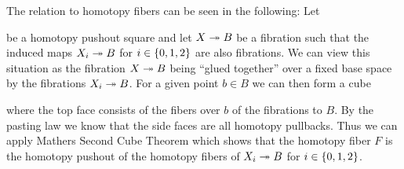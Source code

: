 The relation to homotopy fibers can be seen in the following:
Let 
\begin{center}
\end{center}
be a homotopy pushout square and let $X\xtwoheadrightarrow{} B$ be a fibration such that the induced maps $X_i\xtwoheadrightarrow{} B$ for $i\in\left\lbrace0,1,2\right\rbrace$ are also fibrations.
We can view this situation as the fibration $X\xtwoheadrightarrow{} B$ being ``glued together'' over a fixed base space by the fibrations $X_i\xtwoheadrightarrow{} B$.
For a given point $b\in B$ we can then form a cube 
\begin{center}
\end{center}
where the top face consists of the fibers over $b$ of the fibrations to $B$.
By the pasting law we know that the side faces are all homotopy pullbacks.
Thus we can apply Mathers Second Cube Theorem which shows that the homotopy fiber $F$ is the homotopy pushout of the homotopy fibers of $X_i\xtwoheadrightarrow{} B$ for $i\in\left\lbrace0,1,2\right\rbrace$.

